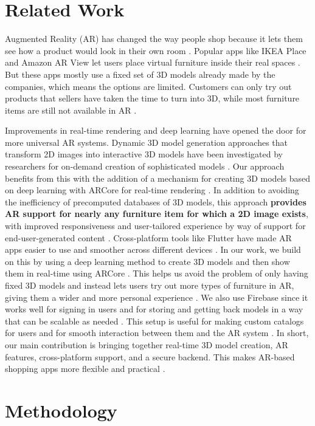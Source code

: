 \documentclass[12pt, a4paper]{article}
\begin{document}
\section{Related Work}

Augmented Reality (AR) has changed the way people shop because it lets them see how a product would look in their own room \cite{ref1}. Popular apps like IKEA Place and Amazon AR View let users place virtual furniture inside their real spaces \cite{ref7}. But these apps mostly use a fixed set of 3D models already made by the companies, which means the options are limited. Customers can only try out products that sellers have taken the time to turn into 3D, while most furniture items are still not available in AR \cite{ref14}.

Improvements in real-time rendering and deep learning have opened the door for more universal AR systems. Dynamic 3D model generation approaches that transform 2D images into interactive 3D models have been investigated by researchers for on-demand creation of sophisticated models \cite{ref12}. Our approach benefits from this with the addition of a mechanism for creating 3D models based on deep learning with ARCore for real-time rendering \cite{ref2}. In addition to avoiding the inefficiency of precomputed databases of 3D models, this approach \textbf{provides AR support for nearly any furniture item for which a 2D image exists}, with improved responsiveness and user-tailored experience by way of support for end-user-generated content \cite{ref5}. Cross-platform tools like Flutter have made AR apps easier to use and smoother across different devices \cite{ref9}. In our work, we build on this by using a deep learning method to create 3D models and then show them in real-time using ARCore \cite{ref2}. This helps us avoid the problem of only having fixed 3D models and instead lets users try out more types of furniture in AR, giving them a wider and more personal experience \cite{ref5}. We also use Firebase since it works well for signing in users and for storing and getting back models in a way that can be scalable as needed \cite{ref4,ref10}. This setup is useful for making custom catalogs for users and for smooth interaction between them and the AR system \cite{ref20}. In short, our main contribution is bringing together real-time 3D model creation, AR features, cross-platform support, and a secure backend. This makes AR-based shopping apps more flexible and practical \cite{ref17}.

\section{Methodology}
\end{document}
